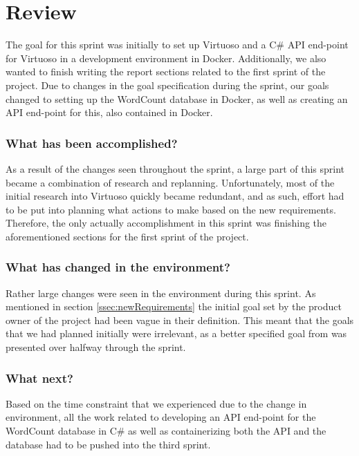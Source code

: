 \section{Review}
The goal for this sprint was initially to set up Virtuoso and a C\# API end-point for Virtuoso in a development environment in Docker. Additionally, we also wanted to finish writing the report sections related to the first sprint of the \knox{} project. Due to changes in the goal specification during the sprint, our goals changed to setting up the WordCount database in Docker, as well as creating an API end-point for this, also contained in Docker.

\subsubsection*{What has been accomplished?}
As a result of the changes seen throughout the sprint, a large part of this sprint became a combination of research and replanning. Unfortunately, most of the initial research into Virtuoso quickly became redundant, and as such, effort had to be put into planning what actions to make based on the new requirements. Therefore, the only actually accomplishment in this sprint was finishing the aforementioned sections for the first sprint of the \knox{} project.  

\subsubsection*{What has changed in the environment?}
Rather large changes were seen in the environment during this sprint. As mentioned in section \ref{ssec:newRequirements} the initial goal set by the product owner of the \knox{} project had been vague in their definition. This meant that the goals that we had planned initially were irrelevant, as a better specified goal from \knox{} was presented over halfway through the sprint. 

\subsubsection*{What next?}
Based on the time constraint that we experienced due to the change in environment, all the work related to developing an API end-point for the WordCount database in C\# as well as containerizing both the API and the database had to be pushed into the third sprint.



